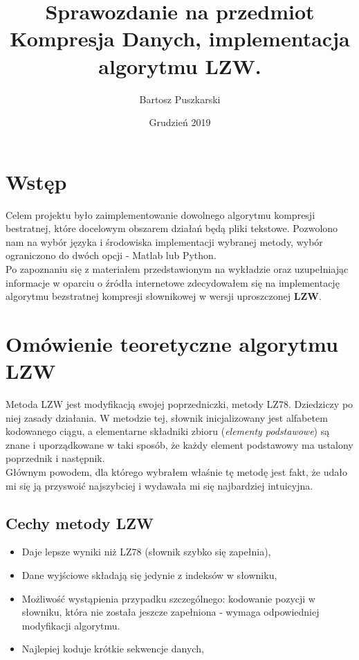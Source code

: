 \documentclass[12pt, a4paper]{article}
\title{Sprawozdanie na przedmiot Kompresja Danych, implementacja algorytmu LZW.}
\author{Bartosz Puszkarski}
\date{Grudzień 2019}
\begin{document}
\maketitle
\thispagestyle{firstPageStyle}
\newpage
\tableofcontents

\newpage

\section{Wstęp}
Celem projektu było zaimplementowanie dowolnego algorytmu kompresji bestratnej, które docelowym obszarem działań będą pliki tekstowe. Pozwolono nam na wybór języka i środowiska implementacji wybranej metody, wybór ograniczono do dwóch opcji - Matlab lub Python.\\
Po zapoznaniu się z materiałem przedstawionym na wykładzie oraz uzupełniając informacje w oparciu o źródła internetowe zdecydowałem się na implementację algorytmu bezstratnej kompresji słownikowej w wersji uproszczonej \textbf{LZW}.

\section{Omówienie teoretyczne algorytmu LZW}
Metoda LZW jest modyfikacją swojej poprzedniczki, metody LZ78. Dziedziczy po niej zasady działania. W metodzie tej, słownik inicjalizowany jest alfabetem kodowanego ciągu, a elementarne składniki zbioru (\textit{elementy podstawowe}) są znane i uporządkowane w taki sposób, że każdy element podstawowy ma ustalony poprzednik i następnik. \\
Głównym powodem, dla którego wybrałem właśnie tę metodę jest fakt, że udało mi się ją przyswoić najszybciej i wydawała mi się najbardziej intuicyjna. 
\subsection{Cechy metody LZW}
\begin{itemize}
\item Daje lepsze wyniki niż LZ78 (słownik szybko się zapełnia),
\item Dane wyjściowe składają się jedynie z indeksów w słowniku,
\item Możliwość wystąpienia przypadku szczególnego: kodowanie pozycji w słowniku, która nie została jeszcze zapełniona - wymaga odpowiedniej modyfikacji algorytmu.
\item Najlepiej koduje krótkie sekwencje danych,
\end{itemize}
\end{document}
